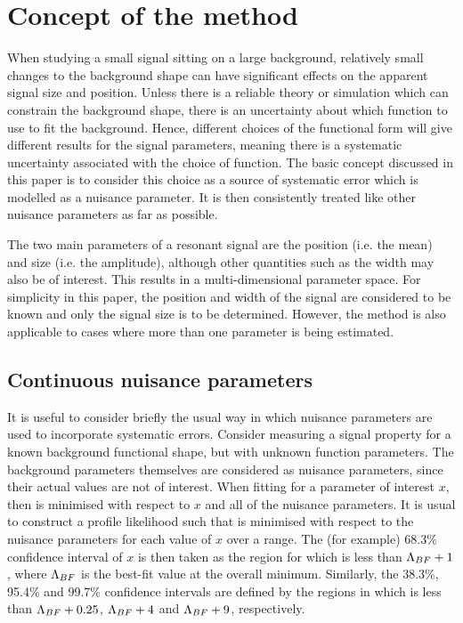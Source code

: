 \section{Concept of the method} %
\label{sec:concept}

When studying a small signal sitting on
a large background, relatively small changes to the background shape can
have significant effects on the apparent signal size and position.
Unless there is a
reliable theory or simulation which can constrain the background shape,
there is an uncertainty about which function to use to fit
the background. Hence, different choices of the functional form 
will give different results for the signal parameters, meaning there is a
systematic uncertainty associated with the choice of function.
The basic concept discussed in this paper is to consider this choice
as a source of systematic error which is modelled as a nuisance parameter.
It is then consistently treated like other nuisance parameters as far as
possible.

The two main parameters of a resonant signal are the position (i.e. the mean)
and size (i.e. the amplitude), although other
quantities such as the width may also be of interest. This results in a
multi-dimensional parameter space. For simplicity in this paper, the position
and width of the signal are considered to be known and only the signal
size is to be determined. However, the method is also applicable to
cases where more than one parameter is being estimated.

\subsection{Continuous nuisance parameters}
\label{sec:concept:continuous}

It is useful to consider briefly the usual way in which nuisance
parameters are used to incorporate systematic errors. Consider measuring a signal
property for a known background functional shape, but with unknown function
parameters. The background parameters themselves are considered as
nuisance parameters, since their actual values are not of interest.
When fitting for a parameter of interest $x$, then \nll  
is minimised with respect to $x$ and all of the
nuisance parameters. It is usual to construct a profile likelihood
such that \nll is minimised with respect to the nuisance parameters
for each value of $x$ over a range.
The (for example) 68.3\% confidence interval of $x$
is then
taken as the region for which \nll is less than ${\rm \Lambda}_{BF}+1$,
where ${\rm \Lambda}_{BF}$ is the best-fit value at the overall minimum.
Similarly, the 38.3\%, 95.4\% and 99.7\% confidence intervals are defined by the
regions in which \nll is less than ${\rm \Lambda}_{BF}+0.25$, ${\rm \Lambda}_{BF}+4$
and ${\rm \Lambda}_{BF}+9$, respectively.

